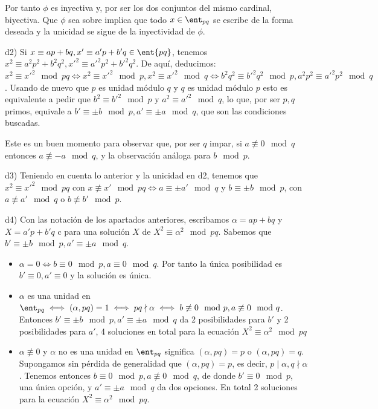 \begin{problem}[7]
Por tanto $\phi$ es inyectiva y, por ser los dos conjuntos del mismo cardinal, biyectiva. Que $\phi$ sea sobre implica que todo $x\in\ent_{pq}$ se escribe de la forma deseada y la unicidad se sigue de la inyectividad de $\phi$.

{\vskip0.2cm}

d2) Si $x\equiv ap+bq, x'\equiv a'p+b'q \in\ent{pq}$, tenemos $x^2\equiv a^2p^2+b^2q^2, x'^2\equiv a'^2p^2+b'^2q^2$. De aquí, deducimos:  $x^2\equiv {x'}^2 \mod pq \iff x^2\equiv {x'}^2 \mod p , x^2\equiv {x'}^2 \mod q \iff b^2q^2\equiv b'^2q^2 \mod p, a^2p^2\equiv a'^2p^2 \mod q$.  Usando de nuevo que $p$ es unidad módulo $q$ y $q$ es unidad módulo $p$ esto es equivalente a pedir que $b^2\equiv b'^2 \mod p$ y $a^2\equiv a'^2 \mod q$, lo que, por ser $p,q$ primos, equivale a $b'\equiv \pm b \mod p, a'\equiv \pm a \mod q$, que son las condiciones buscadas.

Este es un buen momento para observar que, por ser $q$ impar, si $a\not\equiv 0 \mod q$ entonces $a\not\equiv -a \mod q$, y la observación análoga para $b \mod  p$.

{\vskip0.2cm}

d3) Teniendo en cuenta lo anterior y la unicidad en d2, tenemos que  $x^2\equiv {x'}^2 \mod pq$ con $x\not\equiv x'\mod pq \iff a\equiv \pm a' \mod q$ y  $b\equiv \pm b \mod p$, con $a\not\equiv a' \mod q$ o $b\not\equiv b' \mod p$.

{\vskip0.2cm}


d4) Con las notación de los apartados anteriores, escribamos $\alpha=ap+bq$ y $X=a'p+b'q$ c para una solución $X$ de $X^2\equiv\alpha^2 \mod pq$. Sabemos que $b'\equiv \pm b \mod p, a'\equiv \pm a \mod q$.

\begin{itemize}
\item $\alpha=0 \iff b\equiv 0 \mod p, a\equiv 0 \mod q$. Por tanto la única posibilidad es $b'\equiv 0, a'\equiv 0$ y la solución es única.

\item $\alpha$ es una unidad en $\ent_{pq} \iff (\alpha, pq)=1 \iff pq\nmid \alpha \iff b\not\equiv 0 \mod p, a\not\equiv 0 \mod q$. Entonces $b'\equiv \pm b \mod p, a'\equiv \pm a \mod q$ da 2 posibilidades para $b'$ y 2 posibilidades para $a'$, 4 soluciones en total para la ecuación $X^2\equiv\alpha^2 \mod pq$

\item $\alpha\not\equiv 0$ y $\alpha$ no es una unidad en
$\ent_{pq}$ significa $(\alpha, pq)=p$ o $(\alpha, pq)=q$. Supongamos sin pérdida de generalidad que $(\alpha, pq)=p$, es decir, $p\mid \alpha, q\nmid\alpha$. Tenemos entonces $b\equiv 0 \mod p, a\not\equiv 0 \mod q$, de donde $b'\equiv 0 \mod p$, una única opción, y $a'\equiv \pm a \mod q$ da dos opciones. En total 2 soluciones para la ecuación $X^2\equiv\alpha^2 \mod pq$.
\end{itemize}


\end{problem}
